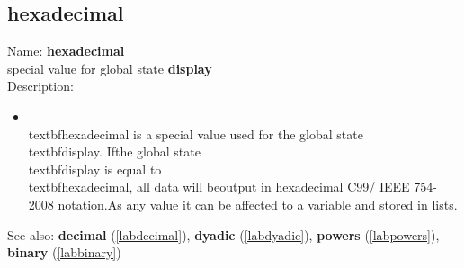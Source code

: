 \subsection{hexadecimal}
\label{labhexadecimal}
\noindent Name: \textbf{hexadecimal}\\
special value for global state \textbf{display}\\
\noindent Description: \begin{itemize}

\item \\textbf{hexadecimal} is a special value used for the global state \\textbf{display}.  If\n   the global state \\textbf{display} is equal to \\textbf{hexadecimal}, all data will be\n   output in hexadecimal C99/ IEEE 754-2008 notation.\n    \n   As any value it can be affected to a variable and stored in lists.\n\end{itemize}
See also: \textbf{decimal} (\ref{labdecimal}), \textbf{dyadic} (\ref{labdyadic}), \textbf{powers} (\ref{labpowers}), \textbf{binary} (\ref{labbinary})
